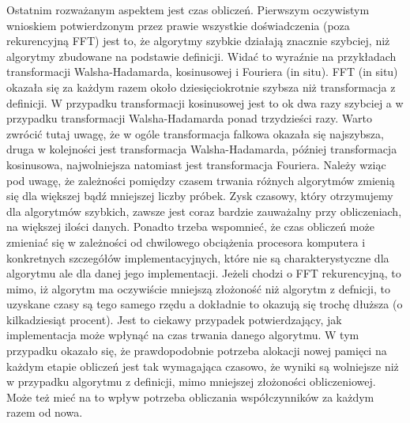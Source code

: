 \documentclass[12pt]{article}
\begin{document}
{        Ostatnim rozważanym aspektem jest czas obliczeń. Pierwszym
        oczywistym wnioskiem potwierdzonym przez prawie wszystkie
        doświadczenia (poza rekurencyjną FFT) jest to, że algorytmy
        szybkie działają znacznie szybciej, niż algorytmy zbudowane na
        podstawie definicji. Widać to wyraźnie na przykładach
        transformacji Walsha-Hadamarda, kosinusowej i Fouriera (in
        situ). FFT (in situ) okazała się za każdym razem około
        dziesięciokrotnie szybsza niż transformacja z definicji. W
        przypadku transformacji kosinusowej jest to ok dwa razy
        szybciej a w przypadku transformacji Walsha-Hadamarda ponad
        trzydzieści razy. Warto zwrócić tutaj uwagę, że w ogóle
        transformacja falkowa okazała się najszybsza, druga w
        kolejności jest transformacja Walsha-Hadamarda, później
        transformacja kosinusowa, najwolniejsza natomiast jest
        transformacja Fouriera. Należy wziąc pod uwagę, że
        zależności pomiędzy czasem trwania różnych algorytmów zmienią
        się dla większej bądź mniejszej liczby próbek. Zysk czasowy,
        który otrzymujemy dla algorytmów szybkich, zawsze jest coraz
        bardzie zauważalny przy obliczeniach, na większej ilości
        danych. Ponadto trzeba wspomnieć, że czas obliczeń może
        zmieniać się w zależności od chwilowego obciążenia procesora
        komputera i konkretnych szczegółów implementacyjnych, które
        nie są charakterystyczne dla algorytmu ale dla danej jego
        implementacji. Jeżeli chodzi o FFT rekurencyjną, to mimo, iż
        algorytm ma oczywiście mniejszą złożoność niż algorytm z
        defnicji, to uzyskane czasy są tego samego rzędu a dokładnie
        to okazują się trochę dłuższa (o kilkadziesiąt procent). Jest
        to ciekawy przypadek potwierdzający, jak implementacja może
        wpłynąć na czas trwania danego algorytmu. W tym przypadku
        okazało się, że prawdopodobnie potrzeba alokacji nowej pamięci
        na każdym etapie obliczeń jest tak wymagająca czasowo, że
        wyniki są wolniejsze niż w przypadku algorytmu z definicji,
        mimo mniejszej złożoności obliczeniowej. Może też mieć na to
        wpływ potrzeba obliczania współczynników za każdym razem
        od nowa.
    }
    \renewcommand\refname{Bibliografia}
    
    
\end{document}
